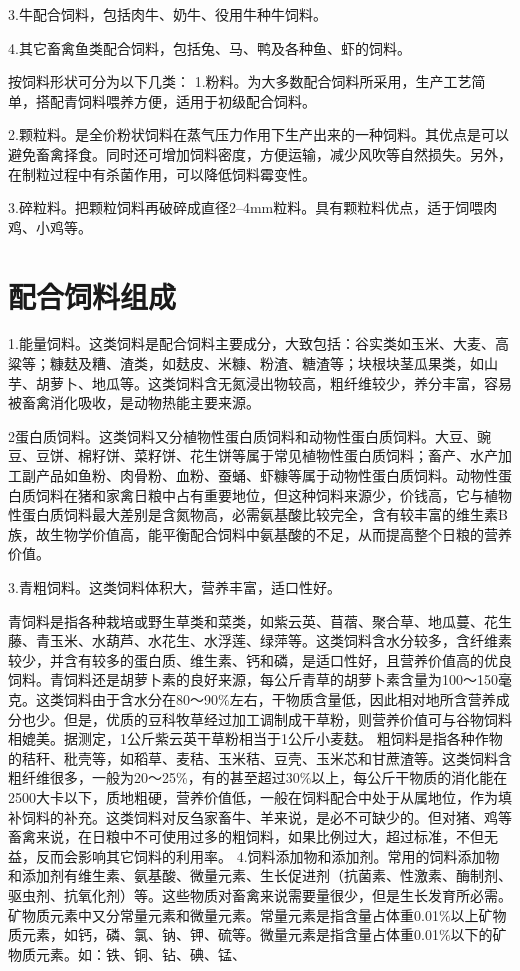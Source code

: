 \documentclass{ctexbook}
\begin{document}
3.牛配合饲料，包括肉牛、奶牛、役用牛种牛饲料。

4.其它畜禽鱼类配合饲料，包括兔、马、鸭及各种鱼、虾的饲料。

按饲料形状可分为以下几类：
1.粉料。为大多数配合饲料所采用，生产工艺简单，搭配青饲料喂养方便，适用于初级配合饲料。

2.颗粒料。是全价粉状饲料在蒸气压力作用下生产出来的一种饲料。其优点是可以避免畜禽择食。同时还可增加饲料密度，方便运输，减少风吹等自然损失。另外，在制粒过程中有杀菌作用，可以降低饲料霉变性。

3.碎粒料。把颗粒饲料再破碎成直径2--4mm粒料。具有颗粒料优点，适于饲喂肉鸡、小鸡等。
\section{配合饲料组成}
1.能量饲料。这类饲料是配合饲料主要成分，大致包括：谷实类如玉米、大麦、高粱等；糠麸及糟、渣类，如麸皮、米糠、粉渣、糖渣等；块根块茎瓜果类，如山芋、胡萝卜、地瓜等。这类饲料含无氮浸出物较高，粗纤维较少，养分丰富，容易被畜禽消化吸收，是动物热能主要来源。

2蛋白质饲料。这类饲料又分植物性蛋白质饲料和动物性蛋白质饲料。大豆、豌豆、豆饼、棉籽饼、菜籽饼、花生饼等属于常见植物性蛋白质饲料；畜产、水产加工副产品如鱼粉、肉骨粉、血粉、蚕蛹、虾糠等属于动物性蛋白质饲料。动物性蛋白质饲料在猪和家禽日粮中占有重要地位，但这种饲料来源少，价钱高，它与植物性蛋白质饲料最大差别是含氮物高，必需氨基酸比较完全，含有较丰富的维生素B族，故生物学价值高，能平衡配合饲料中氨基酸的不足，从而提高整个日粮的营养价值。

3.青粗饲料。这类饲料体积大，营养丰富，适口性好。

青饲料是指各种栽培或野生草类和菜类，如紫云英、苜蓿、聚合草、地瓜蔓、花生藤、青玉米、水葫芦、水花生、水浮莲、绿萍等。这类饲料含水分较多，含纤维素较少，并含有较多的蛋白质、维生素、钙和磷，是适口性好，且营养价值高的优良饲料。青饲料还是胡萝卜素的良好来源，每公斤青草的胡萝卜素含量为100〜150毫克。这类饲料由于含水分在80〜90\%左右，干物质含量低，因此相对地所含营养成分也少。但是，优质的豆科牧草经过加工调制成干草粉，则营养价值可与谷物饲料相媲美。据测定，1公斤紫云英干草粉相当于1公斤小麦麸。
粗饲料是指各种作物的秸秆、秕壳等，如稻草、麦秸、玉米秸、豆壳、玉米芯和甘蔗渣等。这类饲料含粗纤维很多，一般为20〜25\%，有的甚至超过30\%以上，每公斤干物质的消化能在2500大卡以下，质地粗硬，营养价值低，一般在饲料配合中处于从属地位，作为填补饲料的补充。这类饲料对反刍家畜牛、羊来说，是必不可缺少的。但对猪、鸡等畜禽来说，在日粮中不可使用过多的粗饲料，如果比例过大，超过标准，不但无益，反而会影响其它饲料的利用率。
4.饲料添加物和添加剂。常用的饲料添加物和添加剂有维生素、氨基酸、微量元素、生长促进剂（抗菌素、性激素、酶制剂、驱虫剂、抗氧化剂）等。这些物质对畜禽来说需要量很少，但是生长发育所必需。
矿物质元素中又分常量元素和微量元素。常量元素是指含量占体重0.01\%以上矿物质元素，如钙，磷、氯、钠、钾、硫等。微量元素是指含量占体重0.01\%以下的矿物质元素。如：铁、铜、钻、碘、锰、
\end{document}
